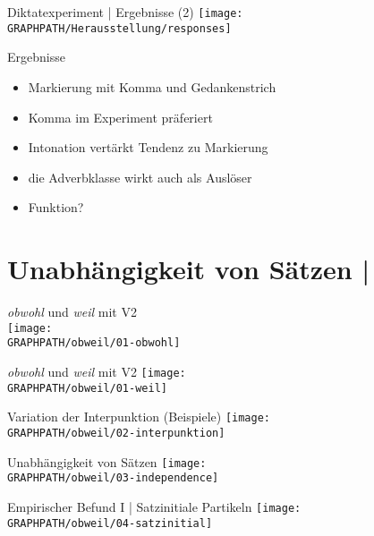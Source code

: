 \begin{frame}
  {Diktatexperiment | Ergebnisse (2)}
  \centering 
  \texttt{[image: \\GRAPHPATH/Herausstellung/responses]}
\end{frame}


\begin{frame}
  {Ergebnisse}
  \begin{itemize}[<+->]
    \item Markierung mit Komma und Gedankenstrich
    \item Komma im Experiment präferiert\\
      \Halbzeile
    \item Intonation vertärkt Tendenz zu Markierung
    \item die Adverbklasse wirkt auch als Auslöser
      \Halbzeile
    \item Funktion?
  \end{itemize}
\end{frame}

\section[Unabhängigkeit]{Unabhängigkeit von Sätzen | \citet{SchaeferSayatz2016}}


\begin{frame}
  {\textit{obwohl} und \textit{weil} mit V2}
  \citet{SchaeferSayatz2016}\\
  \Zeile
  \centering 
  \texttt{[image: \\GRAPHPATH/obweil/01-obwohl]}
\end{frame}

\begin{frame}
  {\textit{obwohl} und \textit{weil} mit V2}
  \centering 
  \texttt{[image: \\GRAPHPATH/obweil/01-weil]}
\end{frame}

\begin{frame}
  {Variation der Interpunktion (Beispiele)}
  \centering 
  \texttt{[image: \\GRAPHPATH/obweil/02-interpunktion]}
\end{frame}

\begin{frame}
  {Unabhängigkeit von Sätzen}
  \centering 
  \texttt{[image: \\GRAPHPATH/obweil/03-independence]} 
\end{frame}

\begin{frame}
  {Empirischer Befund I | Satzinitiale Partikeln}
  \centering 
  \texttt{[image: \\GRAPHPATH/obweil/04-satzinitial]}
\end{frame}


